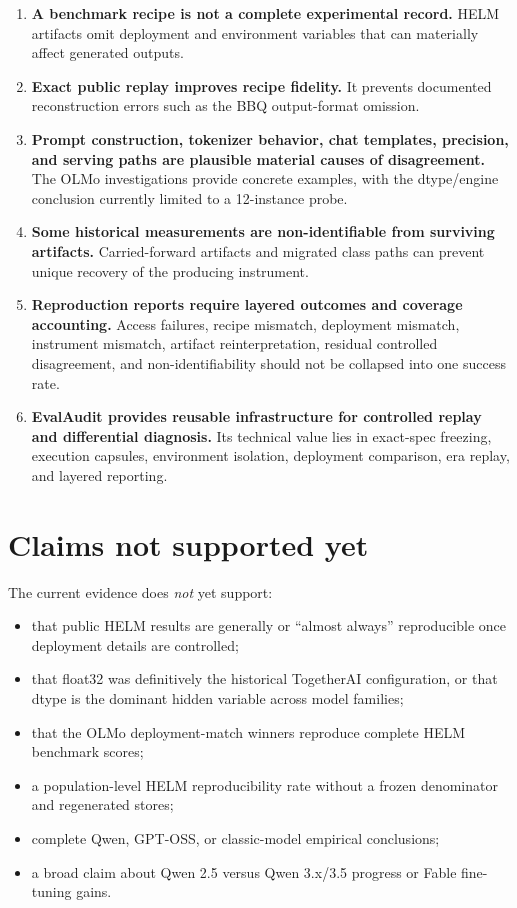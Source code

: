 \documentclass[11pt,oneside]{report}
\newcommand{\code}[1]{\texttt{\detokenize{#1}}}
\begin{document}
\begin{enumerate}
  \item \textbf{A benchmark recipe is not a complete experimental record.} HELM artifacts omit deployment and environment variables that can materially affect generated outputs.
  \item \textbf{Exact public \code{run_spec.json} replay improves recipe fidelity.} It prevents documented reconstruction errors such as the BBQ output-format omission.
  \item \textbf{Prompt construction, tokenizer behavior, chat templates, precision, and serving paths are plausible material causes of disagreement.} The OLMo investigations provide concrete examples, with the dtype/engine conclusion currently limited to a 12-instance probe.
  \item \textbf{Some historical measurements are non-identifiable from surviving artifacts.} Carried-forward artifacts and migrated class paths can prevent unique recovery of the producing instrument.
  \item \textbf{Reproduction reports require layered outcomes and coverage accounting.} Access failures, recipe mismatch, deployment mismatch, instrument mismatch, artifact reinterpretation, residual controlled disagreement, and non-identifiability should not be collapsed into one success rate.
  \item \textbf{EvalAudit provides reusable infrastructure for controlled replay and differential diagnosis.} Its technical value lies in exact-spec freezing, execution capsules, environment isolation, deployment comparison, era replay, and layered reporting.
\end{enumerate}

\section{Claims not supported yet}

The current evidence does \emph{not} yet support:

\begin{itemize}
  \item that public HELM results are generally or ``almost always'' reproducible once deployment details are controlled;
  \item that float32 was definitively the historical TogetherAI configuration, or that dtype is the dominant hidden variable across model families;
  \item that the OLMo deployment-match winners reproduce complete HELM benchmark scores;
  \item a population-level HELM reproducibility rate without a frozen denominator and regenerated stores;
  \item complete Qwen, GPT-OSS, or classic-model empirical conclusions;
  \item a broad claim about Qwen 2.5 versus Qwen 3.x/3.5 progress or Fable fine-tuning gains.
\end{itemize}
\end{document}
